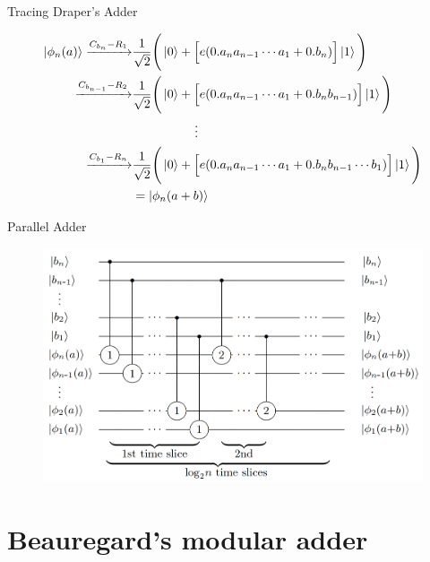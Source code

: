 \documentclass{beamer}
\begin{document}
\begin{frame}{Tracing Draper's Adder}
	
	\begin{align*}
		\ket{\phi_n (a)}
		\xrightarrow{C_{b_n}-R_1}& 
		\frac{1}{\sqrt{2}} \Bigg(
		\ket{0} + \Big[  e(0.a_n a_{n-1} \cdots a_1 + 0.b_n)\Big] \ket{1}
		\Bigg)\\
		\xrightarrow{C_{b_{n-1}}-R_2}& 
		\frac{1}{\sqrt{2}} \Bigg(
		\ket{0} + \Big[  e(0.a_n a_{n-1} \cdots a_1 + 0.b_n b_{n-1})\Big] \ket{1}
		\Bigg)\\
		&\quad\quad\quad\quad\quad\vdots\\
		\xrightarrow{C_{b_1}-R_n}& 
		\frac{1}{\sqrt{2}} \Bigg(
			\ket{0} + \Big[  e(0.a_n a_{n-1} \cdots a_1 + 0.b_n b_{n-1} \cdots b_1)\Big] \ket{1}
		\Bigg)\\
		&= \ket{\phi_n (a+b) }
	\end{align*}

\end{frame}


\begin{frame}{Parallel Adder}
	\begin{figure}[h]
		\centering
		\includegraphics[width=\linewidth]{./paralleladder.png}
	\end{figure}
	
\end{frame}

\section{Beauregard's modular adder}%
\label{sec:beauregard_s_modular_adder}
\end{document}
